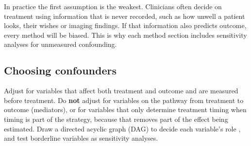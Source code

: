 In practice the first assumption is the weakest. Clinicians often decide on treatment using information that is never recorded, such as how unwell a patient looks, their wishes or imaging findings. If that information also predicts outcome, every method will be biased. This is why each method section includes sensitivity analyses for unmeasured confounding.

\subsection{Choosing confounders}

Adjust for variables that affect both treatment and outcome and are measured before treatment. Do \textbf{not} adjust for variables on the pathway from treatment to outcome (mediators), or for variables that only determine treatment timing when timing is part of the strategy, because that removes part of the effect being estimated. Draw a directed acyclic graph (DAG) to decide each variable's role \cite{hernan2020whatif}, and test borderline variables as sensitivity analyses.
